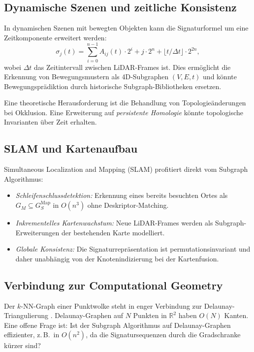 ﻿\documentclass[a4paper,12pt]{article}
\theoremstyle{definition}
\begin{document}
\subsection{Dynamische Szenen und zeitliche Konsistenz}

In dynamischen Szenen mit bewegten Objekten kann die Signaturformel
um eine Zeitkomponente erweitert werden:
\[
  \sigma_j(t) = \sum_{i=0}^{n-1} A_{ij}(t) \cdot 2^i
                + j \cdot 2^n
                + \lfloor t / \Delta t \rfloor \cdot 2^{2n},
\]
wobei $\Delta t$ das Zeitintervall zwischen LiDAR-Frames ist.
Dies ermöglicht die Erkennung von Bewegungsmustern als
4D-Subgraphen $(V, E, t)$ und könnte Bewegungsprädiktion durch
historische Subgraph-Bibliotheken ersetzen.

Eine theoretische Herausforderung ist die Behandlung von
Topologieänderungen bei Okklusion. Eine Erweiterung auf
\emph{persistente Homologie} \citep{Edelsbrunner2002} könnte
topologische Invarianten über Zeit erhalten.

\subsection{SLAM und Kartenaufbau}

Simultaneous Localization and Mapping (SLAM) \citep{Durrant2006}
profitiert direkt vom Subgraph Algorithmus:

\begin{itemize}
  \item \emph{Schleifenschlussdetektion:} Erkennung eines bereits
        besuchten Ortes als $G_M \subseteq G_S^{\mathrm{Map}}$
        in $O(n^3)$ ohne Deskriptor-Matching.
  \item \emph{Inkrementelles Kartenwachstum:} Neue LiDAR-Frames
        werden als Subgraph-Erweiterungen der bestehenden Karte
        modelliert.
  \item \emph{Globale Konsistenz:} Die Signaturrepräsentation ist
        permutationsinvariant und daher unabhängig von der
        Knotenindizierung bei der Kartenfusion.
\end{itemize}

\subsection{Verbindung zur Computational Geometry}

Der $k$-NN-Graph einer Punktwolke steht in enger Verbindung zur
Delaunay-Triangulierung \citep{deBerg2008}. Delaunay-Graphen auf $N$
Punkten in $\mathbb{R}^2$ haben $O(N)$ Kanten. Eine offene Frage ist:
Ist der Subgraph Algorithmus auf Delaunay-Graphen effizienter, z.\,B.\
in $O(n^2)$, da die Signatursequenzen durch die Gradschranke kürzer sind?
\end{document}
